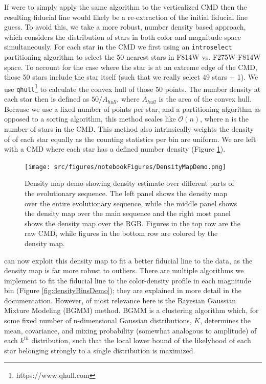 If \fidanka were to simply apply the same algorithm to the verticalized CMD
then the resulting fiducial line would likely be a re-extraction of the initial
fiducial line guess. To avoid this, we take a more robust, number density based
approach, which considers the distribution of stars in both color and magnitude
space simultaneously. For each star in the CMD we first using an
\texttt{introselect} partitioning algorithm to select the 50 nearest stars in
F814W vs. F275W-F814W space. To account for the case where the star is at an
extreme edge of the CMD, those 50 stars include the star itself (such that we
really select 49 stars + 1). We use
\texttt{qhull}\footnote{https://www.qhull.com}\citep{Barber1996} to calculate
the convex hull of those 50 points. The number density at each star then is
defined as $50/A_{hull}$, where $A_{hull}$ is the area of the convex hull.
Because we use a fixed number of points per star, and a partitioning algorithm
as opposed to a sorting algorithm, this method scales like $\mathcal{O}(n)$,
where n is the number of stars in the CMD. This method also intrinsically
weights the density of of each star equally as the counting statistics per bin
are uniform. We are left with a CMD where each star has a defined number
density (Figure \ref{fig:densityMapDemo}).

\begin{figure}
	\centering
	\texttt{[image: src/figures/notebookFigures/DensityMapDemo.png]}
	\label{fig:densityMapDemo}
	\caption{Density map demo showing density estimate over different parts of
	the evolutionary sequence. The left panel shows the density map over the
	entire evolutionary sequence, while the middle panel shows the density map
	over the main sequence and the right most panel shows the density map over
	the RGB. Figures in the top row are the raw CMD, while figures in the
	bottom row are colored by the density map.}
\end{figure}

\fidanka can now exploit this density map to fit a better fiducial line to the
data, as the density map is far more robust to outliers. There are multiple
algorithms we implement to fit the fiducial line to the color-density profile
in each magnitude bin (Figure \ref{fig:densityBinsDemo}); they are explained in
more detail in the \fidanka documentation. However, of most relevance here is
the Bayesian Gaussian Mixture Modeling (BGMM) method. BGMM is a clustering
algorithm which, for some fixed number of n-dimensional Gaussian distributions,
$K$, determines the mean, covariance, and mixing probability (somewhat
analogous to amplitude) of each $k^{th}$ distribution, such that the local
lower bound of the likelyhood of each star belonging strongly to a single
distribution is maximized. 

